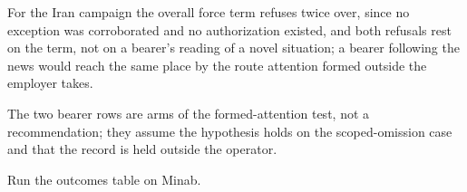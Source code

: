 
For the Iran campaign the overall force term refuses twice over, since no exception was corroborated and no authorization existed, and both refusals rest on the term, not on a bearer's reading of a novel situation; a bearer following the news would reach the same place by the route attention formed outside the employer takes.

The two bearer rows are arms of the formed-attention test, not a recommendation; they assume the hypothesis holds on the scoped-omission case and that the record is held outside the operator.

Run the outcomes table on Minab.

